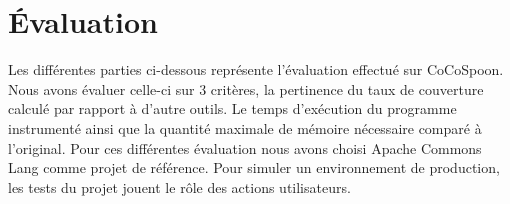 \chapter{Évaluation}
	\thispagestyle{document}

Les différentes parties ci-dessous représente l'évaluation effectué sur CoCoSpoon. Nous avons évaluer celle-ci sur 3 critères, la pertinence du taux de couverture calculé par rapport à d'autre outils. Le temps d'exécution du programme instrumenté ainsi que la quantité maximale de mémoire nécessaire comparé à l'original. Pour ces différentes évaluation nous avons choisi Apache Commons Lang comme projet de référence. Pour simuler un environnement de production, les tests du projet jouent le rôle des actions utilisateurs.
	
		
		
		
		